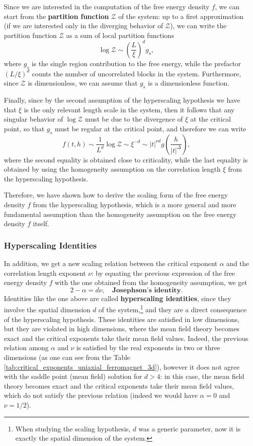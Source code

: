 Since we are interested in the computation of the free energy density \(f\), we can start from the \textbf{partition function} \(\mathcal{Z}\) of the system: up to a first approximation (if we are interested only in the diverging behavior of \(\mathcal{Z}\)), we can write the partition function \(\mathcal{Z}\) as a sum of local partition functions
\[
    \log \mathcal{Z} \sim \left(\frac{L}{\xi}\right)^d g_s,
\]
where \(g_s\) is the single region contribution to the free energy, while the prefactor \((L/\xi)^d\) counts the number of uncorrelated blocks in the system. Furthermore, since \(\mathcal{Z}\) is dimensionless, we can assume that \(g_s\) is a dimensionless function.

Finally, since by the second assumption of the hyperscaling hypothesis we have that \(\xi\) is the only relevant length scale in the system, then it follows that any singular behavior of \(\log \mathcal{Z}\) must be due to the divergence of \(\xi\) at the critical point, so that \(g_s\) must be regular at the critical point, and therefore we can write
\[
    f(t,h) \sim \frac{1}{L^d} \log \mathcal{Z} \sim \xi^{-d} \sim \vert t \vert^{\nu d} g\left(\frac{h}{\vert t \vert^{\Delta}}\right),
\]
where the second equality is obtained close to criticality, while the last equality is obtained by using the homogeneity assumption on the correlation length \(\xi\) from the hyperscaling hypothesis.

Therefore, we have shown how to derive the scaling form of the free energy density \(f\) from the hyperscaling hypothesis, which is a more general and more fundamental assumption than the homogeneity assumption on the free energy density \(f\) itself.

\subsubsection{Hyperscaling Identities}

In addition, we get a new scaling relation between the critical exponent \(\alpha\) and the correlation length exponent \(\nu\): by equating the previous expression of the free energy density \(f\) with the one obtained from the homogeneity assumption, we get
\[
    2-\alpha = d \nu, \quad \textbf{Josephson's identity.}
\]
Identities like the one above are called \textbf{hyperscaling identities}, since they involve the spatial dimension \(d\) of the system,\footnote{When studying the scaling hypothesis, \(d\) was a generic parameter, now it is exactly the spatial dimension of the system.} and they are a direct consequence of the hyperscaling hypothesis. These identities are satisfied in low dimensions, but they are violated in high dimensions, where the mean field theory becomes exact and the critical exponents take their mean field values. Indeed, the previous relation among \(\alpha\) and \(\nu\) is satisfied by the real exponents in two or three dimensions (as one can see from the Table \ref{tab:critical_exponents_uniaxial_ferromagnet_3d}), however it does not agree with the saddle point (mean field) solution for \(d > 4\): in this case, the mean field theory becomes exact and the critical exponents take their mean field values, which do not satisfy the previous relation (indeed we would have \(\alpha=0\) and \(\nu = 1/2\)).

